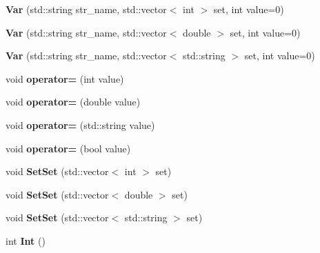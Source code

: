 \begin{DoxyCompactItemize}
{\bfseries Var} (std\+::string str\+\_\+name, std\+::vector$<$ int $>$ set, int value=0)
\item 
\mbox{\label{structostendo_1_1Var_ab359f9ded169486b261d4aca717acee1}} 
{\bfseries Var} (std\+::string str\+\_\+name, std\+::vector$<$ double $>$ set, int value=0)
\item 
\mbox{\label{structostendo_1_1Var_af987ac6b851f5d62984e32f54850ae70}} 
{\bfseries Var} (std\+::string str\+\_\+name, std\+::vector$<$ std\+::string $>$ set, int value=0)
\item 
\mbox{\label{structostendo_1_1Var_a89b2842e7aad2fdf3ae21070655bb436}} 
void {\bfseries operator=} (int value)
\item 
\mbox{\label{structostendo_1_1Var_a828c7ab4e4b53030cea5e94aa34d84d5}} 
void {\bfseries operator=} (double value)
\item 
\mbox{\label{structostendo_1_1Var_a5f9e9d7249cd02d28765d21bf3a80fe5}} 
void {\bfseries operator=} (std\+::string value)
\item 
\mbox{\label{structostendo_1_1Var_a33de8632f442f7751af96d471dae1321}} 
void {\bfseries operator=} (bool value)
\item 
\mbox{\label{structostendo_1_1Var_a16f5d751d92892e903d3631707fd5ea0}} 
void {\bfseries Set\+Set} (std\+::vector$<$ int $>$ set)
\item 
\mbox{\label{structostendo_1_1Var_a796286e938479ad4d3194915a702defa}} 
void {\bfseries Set\+Set} (std\+::vector$<$ double $>$ set)
\item 
\mbox{\label{structostendo_1_1Var_aaa2ebfdc3a5099f234fe105a040cafca}} 
void {\bfseries Set\+Set} (std\+::vector$<$ std\+::string $>$ set)
\item 
\mbox{\label{structostendo_1_1Var_a8112500b840ee7aaee88aeeca6fec4c0}} 
int {\bfseries Int} ()
\item 
\mbox{\label{structostendo_1_1Var_ae9a72f83d152e152dfa0054f05a5bd1a}} 

\end{DoxyCompactItemize}
